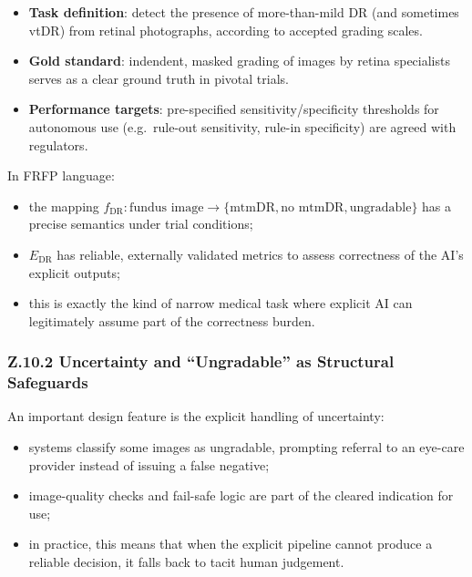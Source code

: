 \begin{itemize}
  \item \textbf{Task definition}:
        detect the presence of more-than-mild DR (and sometimes vtDR) from
        retinal photographs, according to accepted grading scales.
  \item \textbf{Gold standard}:
        indendent, masked grading of images by retina specialists serves as
        a clear ground truth in pivotal trials.
  \item \textbf{Performance targets}:
        pre-specified sensitivity/specificity thresholds for autonomous use
        (e.g.\ rule-out sensitivity, rule-in specificity) are agreed with
        regulators.
\end{itemize}

In FRFP language:

\begin{itemize}
  \item the mapping
        \(
          f_{\mathrm{DR}} : \text{fundus image} \to
          \{\text{mtmDR}, \text{no mtmDR}, \text{ungradable}\}
        \)
        has a precise semantics under trial conditions;
  \item $E_{\mathrm{DR}}$ has reliable, externally validated metrics
        to assess correctness of the AI’s explicit outputs;
  \item this is exactly the kind of narrow medical task where explicit AI
        can legitimately assume part of the correctness burden.
\end{itemize}

\subsubsection*{Z.10.2 Uncertainty and ``Ungradable'' as Structural Safeguards}

An important design feature is the explicit handling of uncertainty:

\begin{itemize}
  \item systems classify some images as ungradable, prompting referral to an
        eye-care provider instead of issuing a false negative;
  \item image-quality checks and fail-safe logic are part of the cleared
        indication for use;
  \item in practice, this means that when the explicit pipeline cannot
        produce a reliable decision, it falls back to tacit human judgement.
\end{itemize}

